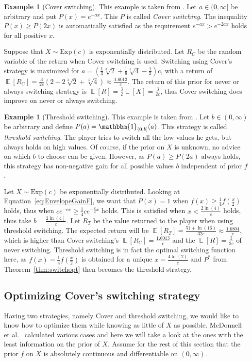 \documentclass[a4paper]{report}
\theoremstyle{plain}
\theoremstyle{definition}
\newtheorem{example}[theorem]{Example}
\theoremstyle{remark}
\numberwithin{equation}{chapter}
\DeclareMathOperator{\E}{\mathbb{E}}
\DeclareMathOperator{\1}{\mathbbm{1}}
\begin{document}
\begin{example}[Cover switching]
This example is taken from \cite{McDonnell09,Abbott10}. Let $a\in(0,\infty]$ be arbitrary and put $P(x)=e^{-ax}$. This $P$ is called \emph{Cover switching}. The inequality $P(x)\geq P(2x)$ is automatically satisfied as the requirement $e^{-ax}>e^{-2ax}$ holds for all positive $x$.

Suppose that $X\sim\mathrm{Exp}(c)$ is exponentially distributed. Let $R_C$ be the random variable of the return when Cover switching is used. Switching using Cover's strategy is maximized for $a=\left(\frac{1}{3}\sqrt[3]{2}+\frac{1}{6}\sqrt[3]{4}-\frac{1}{3}\right)c$, with a return of $\E[R_C]=\frac{3}{2c}\left(2-2\sqrt[3]{2}+\sqrt[3]{4}\right)\approx\frac{1.6013}{c}$. The return of this prior for never or always switching strategy is $\E[R]=\frac{3}{2}\E[X]=\frac{3}{2c}$, thus Cover switching does improve on never or always switching.
\end{example}

\begin{example}[Threshold switching]
This example is taken from \cite{McDonnell09}. Let $b\in(0,\infty)$ be arbitrary and define $P(a)=\1_{(0,b]}(a)$. This strategy is called \emph{threshold switching}. The player tries to switch all the low values he gets, but always holds on high values. Of course, if the prior on $X$ is unknown, no advice on which $b$ to choose can be given. However, as $P(a)\geq P(2a)$ always holds, this strategy has non-negative gain for all possible values $b$ independent of prior $f$.

Let $X\sim\text{Exp}(c)$ be exponentially distributed. Looking at Equation~\ref{eq:EnvelopeGainF}, we want that $P(x)=1$ when $f(x)\geq\frac{1}{4}f\left(\frac{x}{2}\right)$ holds, thus when $ce^{-cx}\geq\frac{1}{4}ce^{-\frac{c}{2}x}$ holds. This is satisfied when $x<\frac{2\ln(4)}{c}$ holds, thus take $b=\frac{2\ln(4)}{c}$. Let $R_T$ be the value returned to the player when using threshold switching. The expected return will be $\E[R_T]=\frac{51+\ln(16)}{32c}\approx\frac{1.6804}{c}$, which is higher than Cover switching's $\E[R_C]=\frac{1.6013}{c}$ and the $\E[R]=\frac{3}{2c}$ of never switching. Threshold switching is in fact the optimal switching function here, as $f(x)=\frac{1}{4}f\left(\frac{x}{2}\right)$ is obtained for a unique $x=\frac{4\ln(2)}{c}$ and $P^*$ from Theorem~\ref{thm:switchopt} then becomes the threshold strategy.
\end{example}
\subsection{Optimizing Cover's switching strategy}
Having two strategies, namely Cover and threshold switching, we would like to know how to optimize them while knowing as little of $X$ as possible. McDonnell et al.~\cite{McDonnell11} calculated various cases and here we will take a look at the ones with the least information on the prior of $X$. Assume for the rest of this section that the prior $f$ on $X$ is absolutely continuous and differentiable on $(0,\infty)$.
\end{document}
